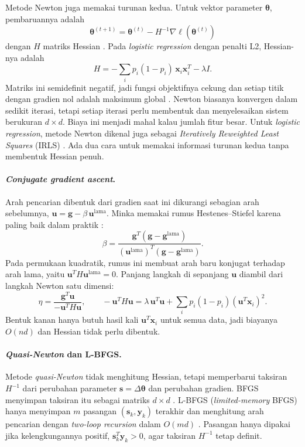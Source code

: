 Metode Newton juga memakai turunan kedua. Untuk vektor parameter $\boldsymbol{\theta}$, pembaruannya adalah
\[
\boldsymbol{\theta}^{(t+1)}=\boldsymbol{\theta}^{(t)}-H^{-1}\nabla\ell\left(\boldsymbol{\theta}^{(t)}\right)
\]
dengan $H$ matriks Hessian \cite[bagian~12.3.1]{ref:shalizi-2012}. Pada \textit{logistic regression} dengan penalti L2, Hessian-nya adalah
\[
H=-\sum_{i}p_i(1-p_i)\,\mathbf{x}_i\mathbf{x}_i^{T}-\lambda I .
\]
Matriks ini semidefinit negatif, jadi fungsi objektifnya cekung dan setiap titik dengan gradien nol adalah maksimum global \cite[bagian~1]{ref:minka-2003}. Newton biasanya konvergen dalam sedikit iterasi, tetapi setiap iterasi perlu membentuk dan menyelesaikan sistem berukuran $d\times d$. Biaya ini menjadi mahal kalau jumlah fitur besar. Untuk \textit{logistic regression}, metode Newton dikenal juga sebagai \textit{Iteratively Reweighted Least Squares} (IRLS) \cite[bagian~12.3.2]{ref:shalizi-2012}. Ada dua cara untuk memakai informasi turunan kedua tanpa membentuk Hessian penuh.

\paragraph{\textit{Conjugate gradient ascent}.} Arah pencarian dibentuk dari gradien saat ini dikurangi sebagian arah sebelumnya, $\mathbf{u}=\mathbf{g}-\beta\,\mathbf{u}^{\mathrm{lama}}$. Minka memakai rumus Hestenes--Stiefel karena paling baik dalam praktik \cite[bagian~4]{ref:minka-2003}:
\[
\beta=\frac{\mathbf{g}^{T}(\mathbf{g}-\mathbf{g}^{\mathrm{lama}})}{(\mathbf{u}^{\mathrm{lama}})^{T}(\mathbf{g}-\mathbf{g}^{\mathrm{lama}})}.
\]
Pada permukaan kuadratik, rumus ini membuat arah baru konjugat terhadap arah lama, yaitu $\mathbf{u}^{T}H\mathbf{u}^{\mathrm{lama}}=0$. Panjang langkah di sepanjang $\mathbf{u}$ diambil dari langkah Newton satu dimensi:
\[
\eta=\frac{\mathbf{g}^{T}\mathbf{u}}{-\mathbf{u}^{T}H\mathbf{u}},
\qquad
-\mathbf{u}^{T}H\mathbf{u}=\lambda\,\mathbf{u}^{T}\mathbf{u}+\sum_i p_i(1-p_i)\left(\mathbf{u}^{T}\mathbf{x}_i\right)^2 .
\]
Bentuk kanan hanya butuh hasil kali $\mathbf{u}^{T}\mathbf{x}_i$ untuk semua data, jadi biayanya $O(nd)$ dan Hessian tidak perlu dibentuk.

\paragraph{\textit{Quasi-Newton} dan L-BFGS.} Metode \textit{quasi-Newton} tidak menghitung Hessian, tetapi memperbarui taksiran $H^{-1}$ dari perubahan parameter $\mathbf{s}=\Delta\boldsymbol{\theta}$ dan perubahan gradien. BFGS menyimpan taksiran itu sebagai matriks $d\times d$ \cite[bagian~6]{ref:minka-2003}. L-BFGS (\textit{limited-memory} BFGS) hanya menyimpan $m$ pasangan $(\mathbf{s}_k,\mathbf{y}_k)$ terakhir dan menghitung arah pencarian dengan \textit{two-loop recursion} dalam $O(md)$ \cite[bab~7]{ref:nocedal-2006}. Pasangan hanya dipakai jika kelengkungannya positif, $\mathbf{s}_k^{T}\mathbf{y}_k>0$, agar taksiran $H^{-1}$ tetap definit.

